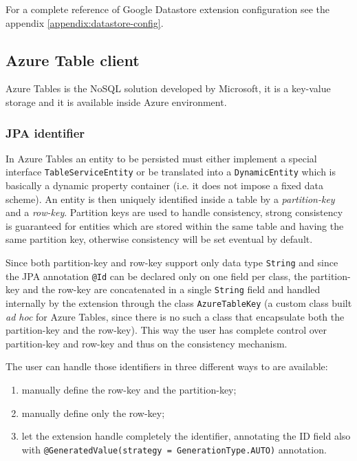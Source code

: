 \newparagraph For a complete reference of Google Datastore extension configuration see the appendix \ref{appendix:datastore-config}.

\subsection{Azure Table client}
\label{sec:kundera-table}
Azure Tables \cite{online:azuretable} is the NoSQL solution developed by Microsoft, it is a key-value storage and it is available inside Azure environment.

\subsubsection{JPA identifier}
In Azure Tables an entity to be persisted must either implement a special interface \texttt{TableServiceEntity} or be translated into a \texttt{DynamicEntity} which is basically a dynamic property container (i.e. it does not impose a fixed data scheme).
An entity is then uniquely identified inside a table by a \textit{partition-key} and a \textit{row-key}.
\noindent Partition keys are used to handle consistency, strong consistency is guaranteed for entities which are stored within the same table and having the same partition key, otherwise consistency will be set eventual by default.

\noindent Since both partition-key and row-key support only data type \texttt{String} and since the JPA annotation \texttt{@Id} can be declared only on one field per class, the partition-key and the row-key are concatenated in a single \texttt{String} field and handled internally by the extension through the class \texttt{AzureTableKey} (a custom class built \textit{ad hoc} for Azure Tables, since there is no such a class that encapsulate both the partition-key and the row-key).
\noindent This way the user has complete control over partition-key and row-key and thus on the consistency mechanism.

\newparagraph The user can handle those identifiers in three different ways to are available:
\begin{enumerate}
\item manually define the row-key and the partition-key;
\item manually define only the row-key;
\item let the extension handle completely the identifier, annotating the ID field also with \texttt{@GeneratedValue(strategy = GenerationType.AUTO)} annotation.
\end{enumerate}


